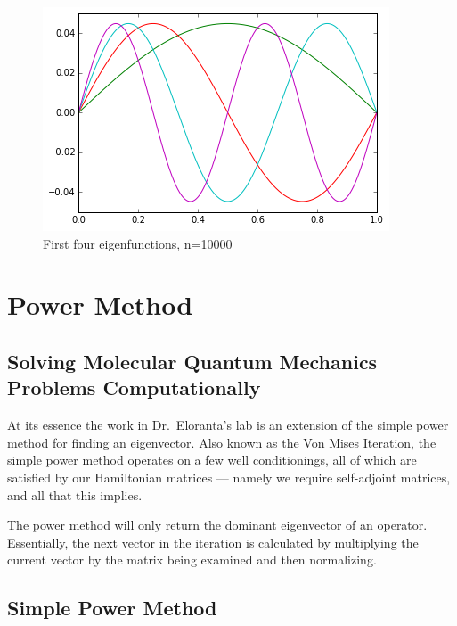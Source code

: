 \documentclass[12pt,]{book}
\begin{document}
\begin{figure}[htbp]
\centering
\includegraphics{assets/graphics/1_5_eigenvectors_25_1.png}
\caption{First four eigenfunctions, n=10000}
\end{figure}

\chapter{Power Method}\label{power-method}

\section{Solving Molecular Quantum Mechanics Problems
Computationally}\label{solving-molecular-quantum-mechanics-problems-computationally}

At its essence the work in Dr.~Eloranta's lab is an extension of the
simple power method for finding an eigenvector. Also known as the Von
Mises Iteration, the simple power method operates on a few well
conditionings, all of which are satisfied by our Hamiltonian matrices
--- namely we require self-adjoint matrices, and all that this implies.

The power method will only return the dominant eigenvector of an
operator. Essentially, the next vector in the iteration is calculated by
multiplying the current vector by the matrix being examined and then
normalizing.

\vfill

\pagebreak

\section{Simple Power Method}\label{simple-power-method}
\end{document}
